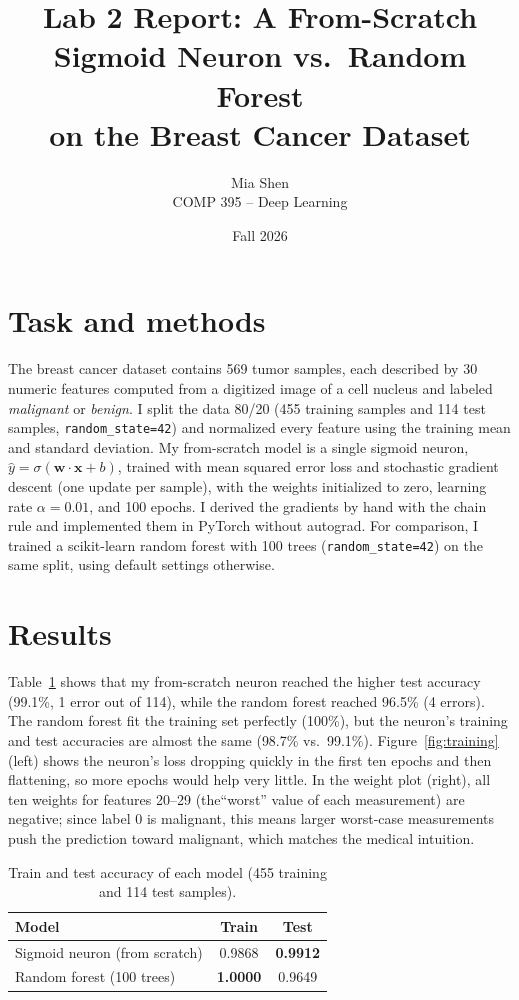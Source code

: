 \documentclass[11pt]{article}
\title{Lab 2 Report: A From-Scratch Sigmoid Neuron vs.\ Random Forest\\on the Breast Cancer Dataset}
\author{Mia Shen \\ COMP 395 -- Deep Learning}
\date{Fall 2026}
\begin{document}
\maketitle

\section*{Task and methods}

The breast cancer dataset contains 569 tumor samples, each
described by 30 numeric features computed from a digitized image of a cell
nucleus and labeled \emph{malignant} or \emph{benign}. I split the data 80/20
(455 training samples and 114 test samples, \texttt{random\_state=42}) and normalized
every feature using the training mean and standard deviation. My from-scratch
model is a single sigmoid neuron, $\hat{y} = \sigma(\mathbf{w}\cdot\mathbf{x} + b)$,
trained with mean squared error loss and stochastic gradient descent (one
update per sample), with the weights initialized to zero, learning rate
$\alpha = 0.01$, and 100 epochs. I derived the gradients by hand with the
chain rule and implemented them in PyTorch without autograd. For comparison, I
trained a scikit-learn random forest with 100 trees (\texttt{random\_state=42})
on the same split, using default settings otherwise.

\section*{Results}

Table~\ref{tab:results} shows that my from-scratch neuron reached the higher
test accuracy (99.1\%, 1 error out of 114), while the random forest reached
96.5\% (4 errors). The random forest fit the training set perfectly (100\%),
but the neuron's training and test accuracies are almost the same (98.7\% vs.\
99.1\%). Figure~\ref{fig:training} (left) shows the neuron's loss dropping
quickly in the first ten epochs and then flattening, so more epochs would help
very little. In the weight plot (right), all ten weights for features 20--29 (the``worst'' value of each measurement) are negative; since label 0 is malignant,
this means larger worst-case measurements push the prediction toward
malignant, which matches the medical intuition.

\begin{table}[H]
  \centering
  \caption{Train and test accuracy of each model (455 training and 114 test samples).}
  \label{tab:results}
  \begin{tabular}{lcc}
    \toprule
    Model & Train & Test \\
    \midrule
    Sigmoid neuron (from scratch) & 0.9868 & \textbf{0.9912} \\
    Random forest (100 trees)     & \textbf{1.0000} & 0.9649 \\
    \bottomrule
  \end{tabular}
\end{table}
\end{document}
